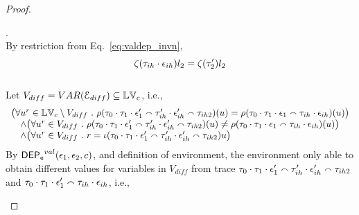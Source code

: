 \begin{proof}
\begin{case}
\begin{subcase}
\begin{subsubcase}
\begin{subsubsubcase}
%
%
\end{subsubsubcase}
\begin{subsubsubcase}.
\\
By restriction from Eq.~\ref{eq:valdep_invn}, 
 \[
 \mathtt{\zeta}(\mathtt{\tau}_{ih} \cdot \mathtt{\epsilon}_{ih}) l_2 = \mathtt{\zeta}(\mathtt{\tau}_{2}') l_2
 \]
%
%
%
\\
Let $V_{diff} = VAR(\mathcal{E}_{diff} ) \subseteq \mathbb{LV}_c$, i.e., 
\[
\begin{array}{l}
  \big(\forall u^r \in \mathbb{LV}_c \setminus V_{diff} ~.~
    \rho(\mathtt{\tau}_0 \cdot \mathtt{\tau}_1 \cdot \mathtt{\epsilon}_1' \smallfrown \mathtt{\tau}_{ih}' \cdot \mathtt{\epsilon}_{ih}' \smallfrown \mathtt{\tau}_{ih2}) (u) =  
    \rho(\mathtt{\tau}_0 \cdot \mathtt{\tau}_1 \cdot \mathtt{\epsilon}_1 \smallfrown \mathtt{\tau}_{ih} \cdot \mathtt{\epsilon}_{ih}) (u)
    \big)
  \\ \quad \land
  \big(\forall u^r \in V_{diff} ~.~ \rho(\mathtt{\tau}_0 \cdot \mathtt{\tau}_1 \cdot \mathtt{\epsilon}_1' \smallfrown \mathtt{\tau}_{ih}' \cdot \mathtt{\epsilon}_{ih}' \smallfrown \mathtt{\tau}_{ih2}) (u) \neq 
    \rho(\mathtt{\tau}_0 \cdot \mathtt{\tau}_1 \cdot \mathtt{\epsilon}_1 \smallfrown \mathtt{\tau}_{ih} \cdot \mathtt{\epsilon}_{ih}) (u) \big)
    \\ \quad \land
    \big(\forall u^r \in V_{diff} ~.~ r = \iota(\mathtt{\tau}_0 \cdot \mathtt{\tau}_1 \cdot \mathtt{\epsilon}_1' \smallfrown \mathtt{\tau}_{ih}' \cdot \mathtt{\epsilon}_{ih}' \smallfrown \mathtt{\tau}_{ih2}) u \big)
  \end{array}
\]
%
By $\mathsf{DEP_{\mathtt{e}}}^{val}(\mathtt{\epsilon}_1, \mathtt{\epsilon}_2, c)$, and definition of environment, 
the environment only able to obtain different values for variables in $V_{diff}$
from trace $\mathtt{\tau}_0 \cdot \mathtt{\tau}_1 \cdot \mathtt{\epsilon}_1' \smallfrown \mathtt{\tau}_{ih}' \cdot \mathtt{\epsilon}_{ih}' \smallfrown \mathtt{\tau}_{ih2}$ 
and 
$\mathtt{\tau}_0 \cdot \mathtt{\tau}_1 \cdot \mathtt{\epsilon}_1' \smallfrown \mathtt{\tau}_{ih} \cdot \mathtt{\epsilon}_{ih}$, i.e.,
%
%
%

\end{subsubsubcase}
\end{subsubcase}
\end{subcase}
\end{case}
\end{proof}
